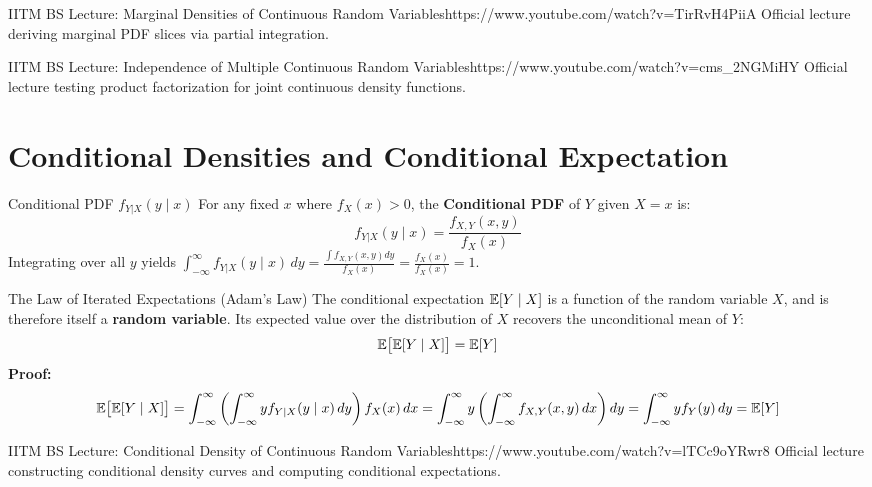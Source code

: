 \begin{videocard}{IITM BS Lecture: Marginal Densities of Continuous Random Variables}{https://www.youtube.com/watch?v=TirRvH4PiiA}
Official lecture deriving marginal PDF slices via partial integration.
\end{videocard}

\begin{videocard}{IITM BS Lecture: Independence of Multiple Continuous Random Variables}{https://www.youtube.com/watch?v=cms_2NGMiHY}
Official lecture testing product factorization for joint continuous density functions.
\end{videocard}

\section{Conditional Densities and Conditional Expectation}

\begin{definitionbox}{Conditional PDF $f_{Y|X}(y \mid x)$}
For any fixed $x$ where $f_X(x) > 0$, the \textbf{Conditional PDF} of $Y$ given $X = x$ is:
$$f_{Y|X}(y \mid x) = \frac{f_{X,Y}(x, y)}{f_X(x)}$$
Integrating over all $y$ yields $\int_{-\infty}^{\infty} f_{Y|X}(y \mid x) \, dy = \frac{\int f_{X,Y}(x,y)dy}{f_X(x)} = \frac{f_X(x)}{f_X(x)} = 1$.
\end{definitionbox}

\begin{theorembox}{The Law of Iterated Expectations (Adam's Law)}
The conditional expectation $\mathbb{E}[Y \mid X]$ is a function of the random variable $X$, and is therefore itself a \textbf{random variable}. Its expected value over the distribution of $X$ recovers the unconditional mean of $Y$:
$$\mathbb{E}\big[ \mathbb{E}[Y \mid X] \big] = \mathbb{E}[Y]$$
\textbf{Proof:}
$$\mathbb{E}\big[ \mathbb{E}[Y \mid X] \big] = \int_{-\infty}^{\infty} \left( \int_{-\infty}^{\infty} y f_{Y|X}(y \mid x) \, dy \right) f_X(x) \, dx = \int_{-\infty}^{\infty} y \left( \int_{-\infty}^{\infty} f_{X,Y}(x, y) \, dx \right) dy = \int_{-\infty}^{\infty} y f_Y(y) \, dy = \mathbb{E}[Y]$$
\end{theorembox}

\begin{videocard}{IITM BS Lecture: Conditional Density of Continuous Random Variables}{https://www.youtube.com/watch?v=lTCc9oYRwr8}
Official lecture constructing conditional density curves and computing conditional expectations.
\end{videocard}


